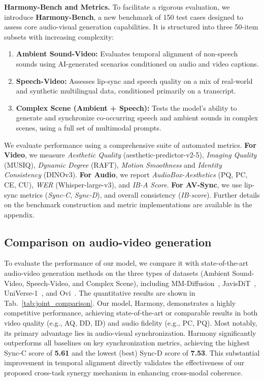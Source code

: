 \noindent\textbf{Harmony-Bench and Metrics.}
To facilitate a rigorous evaluation, we introduce \textbf{Harmony-Bench}, a new benchmark of 150 test cases designed to assess core audio-visual generation capabilities. It is structured into three 50-item subsets with increasing complexity:
\begin{enumerate}
    \item \textbf{Ambient Sound-Video:} Evaluates temporal alignment of non-speech sounds using AI-generated scenarios conditioned on audio and video captions.
    \item \textbf{Speech-Video:} Assesses lip-sync and speech quality on a mix of real-world and synthetic multilingual data, conditioned primarily on a transcript.
    \item \textbf{Complex Scene (Ambient + Speech):} Tests the model's ability to generate and synchronize co-occurring speech and ambient sounds in complex scenes, using a full set of multimodal prompts.
\end{enumerate}
We evaluate performance using a comprehensive suite of automated metrics. \textbf{For Video}, we measure \textit{Aesthetic Quality} (aesthetic-predictor-v2-5), \textit{Imaging Quality} (MUSIQ), \textit{Dynamic Degree} (RAFT), \textit{Motion Smoothness} and \textit{Identity Consistency} (DINOv3). \textbf{For Audio}, we report \textit{AudioBox-Aesthetics} (PQ, PC, CE, CU), \textit{WER} (Whisper-large-v3), and \textit{IB-A Score}. \textbf{For AV-Sync}, we use lip-sync metrics (\textit{Sync-C}, \textit{Sync-D}), 
and overall consistency (\textit{IB-score}). Further details on the benchmark construction and metric implementations are available in the appendix.



\subsection{Comparison on audio-video generation}
To evaluate the performance of our model, we compare it with state-of-the-art audio-video generation methods on the three types of datasets (Ambient Sound-Video, Speech-Video, and Complex Scene), including MM-Diffusion~\cite{ruan2023mmdiffusion}, JavisDiT~\cite{liu2025javisdit}, UniVerse-1~\cite{wang2025universe}, and Ovi~\cite{low2025ovi}. The quantitative results are shown in Tab.~\ref{tab:joint_comparison}. Our model, Harmony, demonstrates a highly competitive performance, achieving state-of-the-art or comparable results in both video quality (e.g., AQ, DD, ID) and audio fidelity (e.g., PC, PQ). Most notably, its primary advantage lies in audio-visual synchronization. Harmony significantly outperforms all baselines on key synchronization metrics, achieving the highest Sync-C score of \textbf{5.61} and the lowest (best) Sync-D score of \textbf{7.53}. This substantial improvement in temporal alignment directly validates the effectiveness of our proposed cross-task synergy mechanism in enhancing cross-modal coherence.

